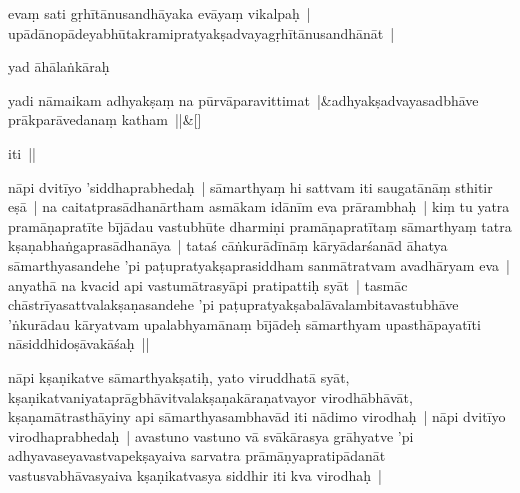 \documentclass[article,12pt,a4paper]{memoir}%
\newcounter{parCount}
\begin{document}
	  
	  

	  \pstart \leavevmode%
	\label{thakur75-72.20}evaṃ sati gṛhītānusandhāyaka evāyaṃ vikalpaḥ | upādānopādeyabhūtakramipratyakṣadvayagṛhītānusandhānāt |
	{}
	\pend%
      

	  \pstart \leavevmode%
	\label{thakur75-72.21}yad āhālaṅkāraḥ
	{}
	\pend%
      
	    
	    \stanza[\smallbreak]
	  \label{ratnakīrtinibandhāvali__lg__yadi_nāmaikam}yadi nāmaikam adhyakṣaṃ na pūrvāparavittimat |&adhyakṣadvayasadbhāve prākparāvedanaṃ katham ||\&[\smallbreak]
	  
	  
	  

	  \pstart \leavevmode%
	iti ||
	{}
	\pend%
      

	  \pstart \leavevmode%
	\label{thakur75-72.24}nāpi dvitīyo 'siddhaprabhedaḥ | sāmarthyaṃ hi sattvam iti saugatānāṃ sthitir eṣā | na caitatprasādhanārtham asmākam idānīm eva prārambhaḥ | kiṃ tu yatra pramāṇapratīte bījādau vastubhūte dharmiṇi pramāṇapratītaṃ sāmarthyaṃ tatra kṣaṇabhaṅgaprasādhanāya |\label{thakur75-72.26} tataś cāṅkurādīnāṃ kāryādarśanād āhatya sāmarthyasandehe 'pi paṭupratyakṣaprasiddham sanmātratvam avadhāryam eva | anyathā na kvacid api vastumātrasyāpi pratipattiḥ syāt | \label{thakur75-72.29} tasmāc chāstrīyasattvalakṣaṇasandehe 'pi paṭupratyakṣabalāvalambitavastubhāve 'ṅkurādau kāryatvam upalabhyamānaṃ bījādeḥ sāmarthyam upasthāpayatīti nāsiddhidoṣāvakāśaḥ ||
	{}
	\pend%
      

	  \pstart \leavevmode%
	\label{thakur75-73.3}nāpi kṣaṇikatve sāmarthyakṣatiḥ, yato viruddhatā syāt, kṣaṇikatvaniyataprāgbhāvitvalakṣaṇakāraṇatvayor virodhābhāvāt, kṣaṇamātrasthāyiny api sāmarthyasambhavād iti nādimo virodhaḥ |\label{thakur75-73.5} nāpi dvitīyo virodhaprabhedaḥ | avastuno vastuno vā svākārasya grāhyatve 'pi adhyavaseyavastvapekṣayaiva sarvatra prāmāṇyapratipādanāt vastusvabhāvasyaiva kṣaṇikatvasya siddhir iti kva virodhaḥ |
	{}
	\pend%
      
\end{document}
